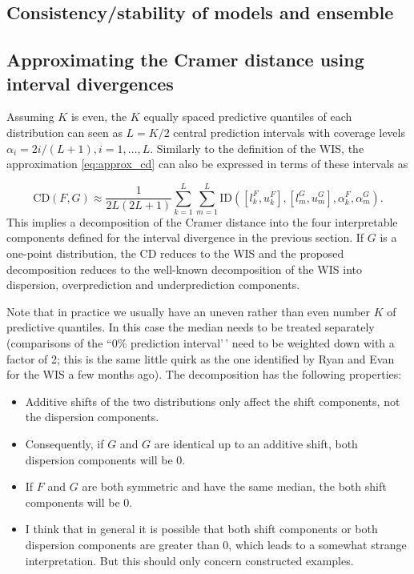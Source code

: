 \documentclass[
]{article}
\begin{document}
\hypertarget{consistencystability-of-models-and-ensemble}{%
\subsection{Consistency/stability of models and
ensemble}\label{consistencystability-of-models-and-ensemble}}

\hypertarget{approximating-the-cramer-distance-using-interval-divergences}{%
\subsection{Approximating the Cramer distance using interval
divergences}\label{approximating-the-cramer-distance-using-interval-divergences}}

Assuming \(K\) is even, the \(K\) equally spaced predictive quantiles of
each distribution can seen as \(L = K/2\) central prediction intervals
with coverage levels \(\alpha_i = 2i/(L + 1), i = 1, \dots, L\).
Similarly to the definition of the WIS, the approximation
\eqref{eq:approx_cd} can also be expressed in terms of these intervals
as

\[
\text{CD}(F, G) \approx \frac{1}{2L(2L + 1)}\sum_{k = 1}^L\sum_{m = 1}^L \text{ID}([l^F_k, u^F_k], [l^G_m, u^G_m], \alpha_k^F, \alpha_m^G).
\] This implies a decomposition of the Cramer distance into the four
interpretable components defined for the interval divergence in the
previous section. If \(G\) is a one-point distribution, the CD reduces
to the WIS and the proposed decomposition reduces to the well-known
decomposition of the WIS into dispersion, overprediction and
underprediction components.

Note that in practice we usually have an uneven rather than even number
\(K\) of predictive quantiles. In this case the median needs to be
treated separately (comparisons of the ``0\% prediction interval'\,'
need to be weighted down with a factor of 2; this is the same little
quirk as the one identified by Ryan and Evan for the WIS a few months
ago). The decomposition has the following properties:

\begin{itemize}
\item Additive shifts of the two distributions only affect the shift components, not the dispersion components.
\item Consequently, if $G$ and $G$ are identical up to an additive shift, both dispersion components will be 0.
\item If $F$ and $G$ are both symmetric and have the same median, the both shift components will be 0.
\item I think that in general it is possible that both shift components or both dispersion components are greater than 0, which leads to a somewhat strange interpretation. But this should only concern constructed examples.
\end{itemize}
\end{document}
